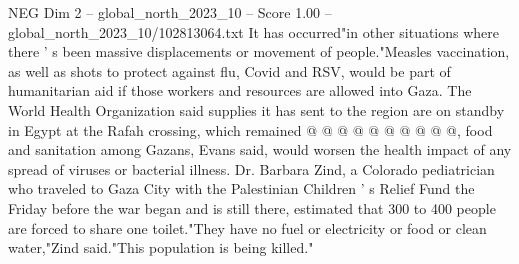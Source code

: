 \begin{textsample}{NEG Dim 2 – global\_north\_2023\_10 – Score 1.00 – global\_north\_2023\_10/102813064.txt}
It has occurred"in other situations where there ' s been massive displacements or movement of people."Measles vaccination, as well as shots to protect against flu, Covid and RSV, would be part of humanitarian aid if those workers and resources are allowed into Gaza.
The World Health Organization said supplies it has sent to the region are on standby in Egypt at the Rafah crossing, which remained @ @ @ @ @ @ @ @ @ @, food and sanitation among Gazans, Evans said, would worsen the health impact of any spread of viruses or bacterial illness.
Dr.
Barbara Zind, a Colorado pediatrician who traveled to Gaza City with the Palestinian Children ' s Relief Fund the Friday before the war began and is still there, estimated that 300 to 400 people are forced to share one toilet."They have no fuel or electricity or food or clean water,"Zind said."This population is being killed."

\end{textsample}
